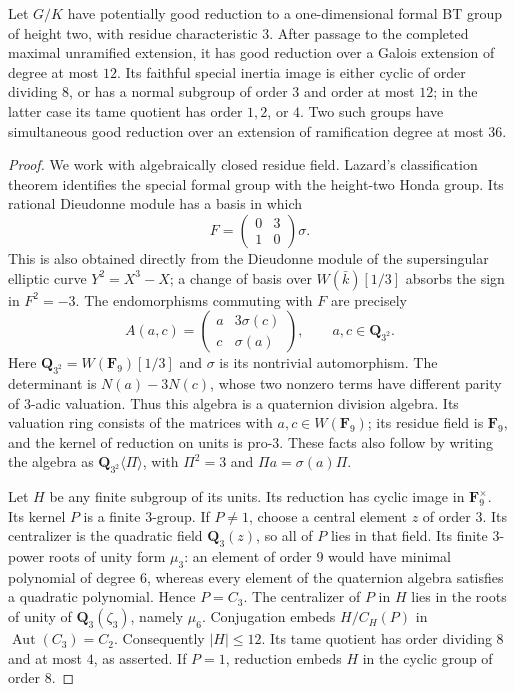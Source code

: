 \begin{lemma}
\label{lem:B-RD31-finite}
Let $G/K$ have potentially good reduction to a one-dimensional
formal BT group of height two, with residue characteristic $3$.
After passage to the completed maximal unramified extension, it
has good reduction over a Galois extension of degree at most $12$.
Its faithful special inertia image is either cyclic of order
dividing $8$, or has a normal subgroup of order $3$ and order at
most $12$; in the latter case its tame quotient has order $1,2$,
or $4$. Two such groups have simultaneous good reduction over an
extension of ramification degree at most $36$.
\end{lemma}
\begin{proof}
We work with algebraically closed residue field. Lazard's
classification theorem \cite[Theorem~IV, pp.270--271]{Lazard1955Formal}
identifies the special formal group with the height-two Honda
group. Its rational Dieudonne module has a basis in which
\[
 F=\begin{pmatrix}0&3\\1&0\end{pmatrix}\sigma.
\]
This is also obtained directly from the Dieudonne module of the
supersingular elliptic curve $Y^2=X^3-X$; a change of basis over
$W(\bar k)[1/3]$ absorbs the sign in $F^2=-3$.
The endomorphisms commuting with $F$ are precisely
\[
 A(a,c)=\begin{pmatrix}a&3\sigma(c)\\c&\sigma(a)\end{pmatrix},
       \qquad a,c\in\mathbf Q_{3^2}.
                                                        \tag{B-RD31.1}
\]
Here $\mathbf Q_{3^2}=W(\mathbf F_9)[1/3]$ and $\sigma$ is its
nontrivial automorphism. The determinant is
$N(a)-3N(c)$, whose two nonzero terms have different parity of
$3$-adic valuation. Thus this algebra is a quaternion division
algebra. Its valuation ring consists of the matrices with
$a,c\in W(\mathbf F_9)$; its residue field is $\mathbf F_9$, and
the kernel of reduction on units is pro-$3$. These facts also
follow by writing the algebra as
$\mathbf Q_{3^2}\langle\Pi\rangle$, with
$\Pi^2=3$ and $\Pi a=\sigma(a)\Pi$.

Let $H$ be any finite subgroup of its units. Its reduction has
cyclic image in $\mathbf F_9^\times$. Its kernel $P$ is a finite
$3$-group. If $P\ne1$, choose a central element $z$ of order $3$.
Its centralizer is the quadratic field $\mathbf Q_3(z)$, so all
of $P$ lies in that field. Its finite $3$-power roots of unity
form $\mu_3$: an element of order $9$ would have minimal
polynomial of degree $6$, whereas every element of the
quaternion algebra satisfies a quadratic polynomial. Hence
$P=C_3$. The centralizer of $P$ in $H$ lies in the roots of unity
of $\mathbf Q_3(\zeta_3)$, namely $\mu_6$. Conjugation embeds
$H/C_H(P)$ in $\operatorname{Aut}(C_3)=C_2$. Consequently
$|H|\leq12$. Its tame quotient has order dividing $8$ and at
most $4$, as asserted. If $P=1$, reduction embeds $H$ in the
cyclic group of order $8$.


\end{proof}
